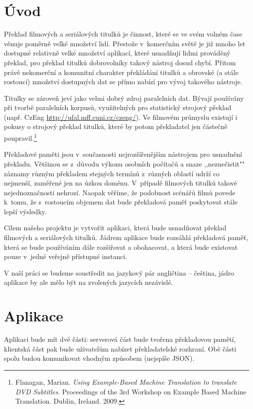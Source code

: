 \section{Úvod}

Překlad filmových a seriálových titulků je činnost, které se ve svém volném čase věnuje poměrně velké množství lidí. Přestože v~komerčním světě je již mnoho let dostupné relativně velké množství aplikací, které usnadňují lidmi prováděný překlad, pro překlad titulků dobrovolníky takový nástroj dosud chybí. Přitom právě nekomerční a komunitní charakter překládání titulků a obrovské (a stále rostoucí) množství dostupných dat se přímo nabízí pro vývoj takového nástroje.

Titulky se zároveň jeví jako velmi dobrý zdroj paralelních dat. Bývají používány při tvorbě paralelních korpusů, využitelných pro statistický strojový překlad (např. CzEng \url{http://ufal.mff.cuni.cz/czeng/}). Ve filmovém průmyslu existují i pokusy o strojový překlad titulků, které by potom překladatel jen částečně poupravil.\footnote{Flanagan, Marian. \emph{Using Example-Based Machine Translation to translate DVD Subtitles}. Proceedings of the 3rd Workshop on Example Based Machine Translation. Dublin, Ireland. 2009.}

Překladové paměti jsou v~současnosti nejrozšířenějším nástrojem pro usnadnění překladu. Většinou se z~důvodu výkonu osobních počítačů a snaze ,,neznečistit"" záznamy různým překladem stejných termínů z~různých oblastí udrží co nejmenší, zaměřené jen na úzkou doménu. V~případě filmových titulků takové nejednoznačnosti nehrozí. Naopak věříme, že podobnost scénářů filmů povede k~tomu, že s~rostoucím objemem dat bude překladová paměť poskytovat stále lepší výsledky.

Cílem našeho projektu je vytvořit aplikaci, která bude usnadňovat překlad filmových a se\-ri\-á\-lo\-vých titulků. Jádrem aplikace bude rozsáhlá překladová paměť, která se bude používáním dále rozšiřovat a obohacovat, a která bude existovat pouze v~jedné veřejně přístupné instanci.

V naší práci se budeme soustředit na jazykový pár angličtina – čeština, jádro aplikace by ale mělo být na zvolených jazycích nezávislé.

\section{Aplikace}
Aplikaci bude mít dvě části: serverová část bude tvořena překladovou pamětí, klientská část pak bude uživatelům nabízet překladatelské rozhraní. Obě části spolu budou komunikovat vhodným způsobem (nejspíše JSON).

